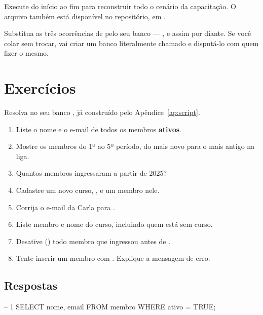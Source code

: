 \begin{apendicesenv}
Execute do início ao fim para reconstruir todo o cenário da capacitação. O
arquivo também está disponível no repositório, em
.

\begin{aviso}
Substitua as três ocorrências de  pelo seu banco
--- ,  e assim por diante. Se você colar
sem trocar, vai criar um banco literalmente chamado  e
disputá-lo com quem fizer o mesmo.
\end{aviso}



\chapter{Exercícios}
\label{ap:exercicios}

Resolva no seu banco , já construído pelo
Apêndice~\ref{ap:script}.

\begin{enumerate}
    \item Liste o nome e o e-mail de todos os membros \textbf{ativos}.
    \item Mostre os membros do 1º ao 5º período, do mais novo para o mais
          antigo na liga.
    \item Quantos membros ingressaram a partir de 2025?
    \item Cadastre um novo curso, , e um membro
          nele.
    \item Corrija o e-mail da Carla para .
    \item Liste membro e nome do curso, incluindo quem está sem curso.
    \item Desative () todo membro que ingressou antes de
          .
    \item Tente inserir um membro com . Explique a
          mensagem de erro.
\end{enumerate}

\section{Respostas}

\begin{sqlcode}[caption={Exercícios 1 a 3}]
-- 1
SELECT nome, email FROM membro WHERE ativo = TRUE;


\end{sqlcode}
\end{apendicesenv}
